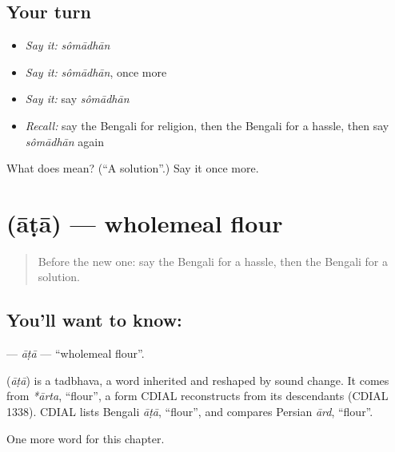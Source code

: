 \subsection*{Your turn}
\begin{itemize}
\raggedright
  \item \emph{Say it:} \emph{sômādhān}
  \item \emph{Say it:} \emph{sômādhān}, once more
  \item \emph{Say it:} say \emph{sômādhān}
  \item \emph{Recall:} say the Bengali for religion, then the Bengali for a hassle, then say \emph{sômādhān} again
\end{itemize}

\begin{tcolorbox}[breakable,colback=teal!4,colframe=teal!35!black,title={Before you move on}]
What does  mean? (\textquotedblleft{}A solution\textquotedblright{}.) Say it once more.
\end{tcolorbox}
\section[\texorpdfstring{\bn{আটা} (āṭā)}{আটা (āṭā)}]{ (āṭā) — wholemeal flour}

\label{lesson:BN-C231-ata2}



\begin{quote}
Before the new one: say the Bengali for a hassle, then the Bengali for a solution.
\end{quote}

\subsection*{You'll want to know: }
\textbf{} — \emph{āṭā} — \textquotedblleft{}wholemeal flour\textquotedblright{}.

\begin{cousinweb}
\textbf{} (\emph{āṭā}) is a tadbhava, a word inherited and reshaped by sound change. It comes from \emph{*ārta}, \textquotedblleft{}flour\textquotedblright{}, a form CDIAL reconstructs from its descendants (CDIAL 1338). CDIAL lists Bengali \emph{āṭā}, \textquotedblleft{}flour\textquotedblright{}, and compares Persian \emph{ārd}, \textquotedblleft{}flour\textquotedblright{}.
\end{cousinweb}

\begin{grammarlens}[title={What you've built}]
One more word for this chapter.
\end{grammarlens}

